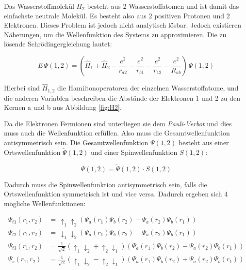Das Wasserstoffmolekül $H_2$ besteht aus 2 Wasserstoffatomen und ist damit das einfachste neutrale Molekül. Es besteht also aus 2 positiven Protonen und 2 Elektronen. Dieses Problem ist jedoch nicht analytisch lösbar. Jedoch existieren Näherungen, um die Wellenfunktion des Systems zu approximieren. Die zu lösende Schrödingergleichung lautet:

\begin{equation}
    E \, \Psi (1, 2) = \left( \hat{H}_1 + \hat{H}_2 - \frac{e^2}{r_{a2}} - \frac{e^2}{r_{b1}} - \frac{e^2}{r_{12}} - \frac{e^2}{R_{ab}} \right) \, \Psi (1, 2)
    \label{eqn:H2}
\end{equation}

Hierbei sind $\hat{H}_{1,2}$ die Hamiltonoperatoren der einzelnen Wasserstoffatome, und die anderen Variablen beschreiben die Abstände der Elektronen 1 und 2 zu den Kernen a und b aus Abbildung \ref{fig:H2}.


Da die Elektronen Fermionen sind unterliegen sie dem \textit{Pauli-Verbot} und dies muss auch die Wellenfunktion erfüllen. Also muss die Gesamtwellenfunktion antisymmetrisch sein. Die Gesamtwellenfunktion $\Psi (1,2)$ besteht aus einer Ortswellenfunktion $\tilde{\Psi} (1,2)$ und einer Spinwellenfunktion $S (1,2)$:

\begin{equation}
    \Psi (1,2) = \tilde{\Psi} (1,2) \cdot S (1,2)
    \label{eqn:gesamt}
\end{equation}

Dadurch muss die Spinwellenfunktion antisymmetrisch sein, falls die Ortswellenfunktion symmetrisch ist und vice versa. Dadurch ergeben sich 4 mögliche Wellenfunktionen:

\begin{align}
    \Psi_{t1} (r_1, r_2) &= \, \uparrow_1 \uparrow_2 \left( \Psi_a (r_1) \Psi_b (r_2) - \Psi_a (r_2) \Psi_b (r_1) \right) \\
    \Psi_{t2} (r_1, r_2) &= \, \downarrow_1 \downarrow_2 \left( \Psi_a (r_1) \Psi_b (r_2) - \Psi_a (r_2) \Psi_b (r_1) \right) \\
    \Psi_{t3} (r_1, r_2) &= \frac{1}{\sqrt{2}} \left( \uparrow_1 \downarrow_2 + \uparrow_2 \downarrow_1 \right) \left( \Psi_a (r_1) \Psi_b (r_2) - \Psi_a (r_2) \Psi_b (r_1) \right) \\
    \Psi_{s} (r_1, r_2) &= \frac{1}{\sqrt{2}} \left( \uparrow_1 \downarrow_2 - \uparrow_2 \downarrow_1 \right) \left( \Psi_a (r_1) \Psi_b (r_2) + \Psi_a (r_2) \Psi_b (r_1) \right)
\end{align}

